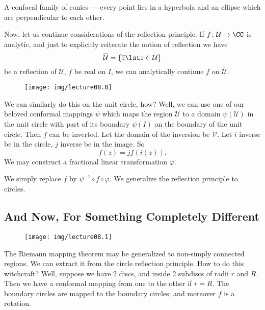 
A confocal family of conics --- every point lies in a hyperbola
and an ellipse which are perpendicular to each other.

Now, let us continue considerations of the reflection
principle. If $f\colon\mathcal{U}\to\CC$ is analytic, and just to
explicitly reiterate the notion of reflection we have
\begin{equation}
\overline{\mathcal{U}}=\{\overline{z}\lst z\in\mathcal{U}\}
\end{equation}
be a reflection of $\mathcal{U}$, $f$ be real on $I$, we can
analytically continue $f$ on $\overline{\mathcal{U}}$. 

\begin{wrapfigure}[14]{r}{3.3in}
\vspace{-25pt}
\begin{center}
\texttt{[image: img/lecture08.0]}
\end{center}
\end{wrapfigure}
We can similarly do this on the unit circle, how? Well, we can
use one of our beloved conformal mappings $\psi$ which maps the
region $\mathcal{U}$ to a domain $\psi(\mathcal{U})$ in the unit
circle with part of its boundary $\psi(I)$ on the boundary of the
unit circle. Then $f$ can be inverted. Let the domain of the
inversion be $\mathcal{V}$. Let $i$ inverse be in the circle, $j$
inverse be in the image. So
\begin{equation}
f(z)=jf(i(z)).
\end{equation}
We may construct a fractional linear transformation $\varphi$.

We simply replace $f$ by $\psi^{-1}\circ f\circ\varphi$. We
generalize the reflection principle to circles.


\subsection*{And Now, For Something Completely Different}

\begin{wrapfigure}[5]{r}{1.7in}
\vspace{-20pt}
\begin{center}
\texttt{[image: img/lecture08.1]}
\end{center}
\end{wrapfigure}
The Riemann mapping theorem may be generalized to non-simply
connected regions. We can extract it from the circle reflection
principle. How to do this witchcraft? Well, suppose we have 2
discs, and inside 2 subdiscs of radii $r$ and $R$. Then we have a
conformal mapping from one to the other if $r=R$. The boundary
circles are mapped to the boundary circles; and moreover $f$ is a
rotation.

